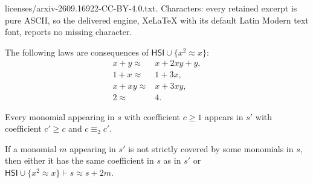\documentclass[10pt,a4paper]{amsart}
\newcommand{\HSI}{\textsf{HSI}}
\newcommand{\up}[1]{\textup{#1}}
\begin{document}
licenses/arxiv-2609.16922-CC-BY-4.0.txt. Characters: every retained excerpt is pure ASCII, so the delivered engine, XeLaTeX with its default Latin Modern text font, reports no missing character.
\begin{lem}\label{lem:x2x}
The following laws are consequences of $\HSI\cup\{x^2\approx x\}$\up:
\begin{align*}
x+y\approx {}&x+2xy +y,\\
1+x\approx {}& 1+3x,\\
x+xy\approx{}& x+3xy,\\
2\approx{}& 4.
\end{align*}
\end{lem}

\begin{lem}\label{lem:equivmod2}
Every monomial appearing in $s$ with coefficient $c\geq 1$ appears in $s'$ with coefficient $c'\geq c$ and $c\equiv_2 c'$.
\end{lem}

\begin{lem}\label{lem:canincreasemod2}
If a monomial $m$ appearing in $s'$ is not strictly covered by some monomials in $s$, then either it has the same coefficient in $s$ as in $s'$ or  $\HSI\cup\{x^2\approx x\}\vdash s\approx s+2m$.
\end{lem}
\end{document}
